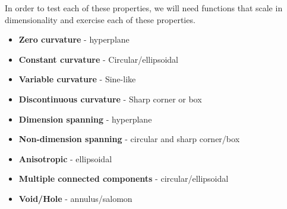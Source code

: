 \documentclass[12pt]{article}
\begin{document}
In order to test each of these properties, we will need functions that scale in dimensionality and exercise each of these properties.

\begin{itemize}
	\item \textbf{Zero curvature} - hyperplane 
	\item \textbf{Constant curvature} - Circular/ellipsoidal
	\item \textbf{Variable curvature} - Sine-like
	\item \textbf{Discontinuous curvature} - Sharp corner or box
\end{itemize}

\begin{itemize}
	\item \textbf{Dimension spanning} - hyperplane
	\item \textbf{Non-dimension spanning} - circular and sharp corner/box
	\item \textbf{Anisotropic} - ellipsoidal
	\item \textbf{Multiple connected components} - circular/ellipsoidal
	\item \textbf{Void/Hole} - annulus/salomon
\end{itemize}



\end{document}
